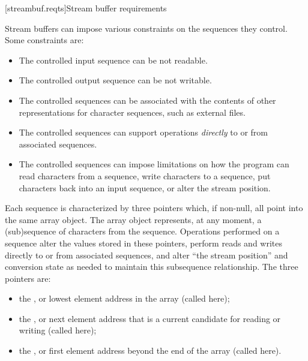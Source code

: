 [streambuf.reqts]{Stream buffer requirements}

\pnum
Stream buffers can impose various constraints on the sequences they control.
Some constraints are:
\begin{itemize}
\item
The controlled input sequence can be not readable.
\item
The controlled output sequence can be not writable.
\item
The controlled sequences can be associated with the contents of other
representations for character sequences, such as external files.
\item
The controlled sequences can support operations
\textit{directly}
to or from associated sequences.
\item
The controlled sequences can impose limitations on how the program can
read characters from a sequence,
write characters to a sequence,
put characters back into an input sequence, or
alter the stream position.
\end{itemize}

\pnum
Each sequence is characterized by three pointers which, if non-null,
all point into the same
array object.
The array object represents, at any moment,
a (sub)sequence of characters from the sequence.
Operations performed on a sequence alter the values stored in these pointers,
perform reads and writes directly to or from associated sequences, and
alter ``the stream position'' and conversion state as needed to
maintain this subsequence relationship.
The three pointers are:
\begin{itemize}
\item
the
,
or lowest element address in the array
(called  here);
\item
the
,
or next element address that is a current
candidate for reading or writing (called  here);
\item
the
,
or first element address beyond the end of
the array (called  here).
\end{itemize}

